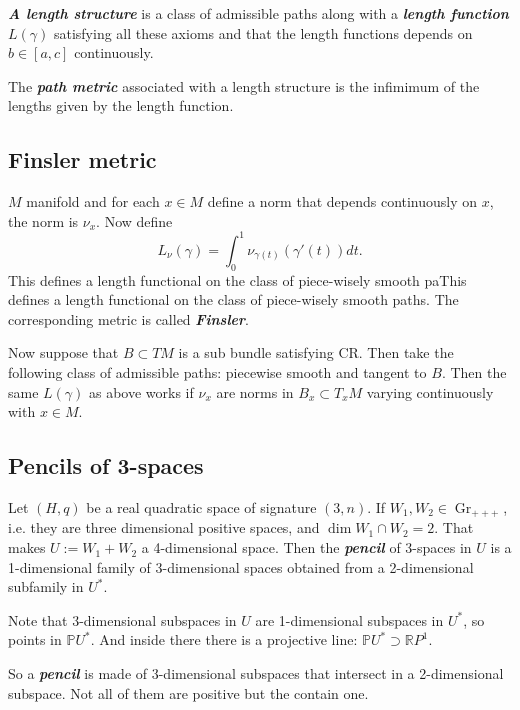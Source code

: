 \begin{defn}\leavevmode
	\textit{\textbf{A length structure}} is a class of admissible paths along with a \textit{\textbf{length function}} $L(\gamma)$ satisfying all these axioms and that the length functions depends on $b\in [a,c]$ continuously.
\end{defn}

\begin{defn}\leavevmode
	The \textit{\textbf{path metric}} associated with a length structure is the infimimum of the lengths given by the length function.
\end{defn}

\subsection{Finsler metric}

\begin{defn}\leavevmode
$M$ manifold and for each  $x \in M$ define a norm that depends continuously on $x$, the norm is $\nu_x$. Now define
\[L_\nu(\gamma)=\int_{0}^1 \nu_{\gamma(t)}(\gamma'(t))dt.\]
This defines a length functional on the class of piece-wisely smooth paThis defines a length functional on the class of piece-wisely smooth paths. The corresponding metric is called \textit{\textbf{Finsler}}.
\end{defn}

\begin{defn}\leavevmode
Now suppose that $B \subset TM$ is a sub bundle satisfying CR. Then take the following class of admissible paths: piecewise smooth and tangent to $B$. Then the same $L(\gamma)$ as above works if $\nu_x$ are norms in  $B_x \subset T_xM$ varying continuously with $x \in M$.
\end{defn}

\subsection{Pencils of 3-spaces}

\begin{defn}\leavevmode
Let $(H,q)$ be a real quadratic space of signature  $(3,n)$. If  $W_1,W_2 \in \operatorname{Gr}_{+ + +}$, i.e. they are three dimensional positive spaces, and  $\dim W_1 \cap W_2=2$. That makes $U:= W_1+W_2$ a 4-dimensional space. Then the \textit{\textbf{pencil}} of 3-spaces in $U$ is a 1-dimensional family of 3-dimensional spaces obtained from a 2-dimensional subfamily in $U^*$.

Note that $3$-dimensional subspaces in $U$ are 1-dimensional subspaces in $U^*$, so points in $\mathbb{P} U^*$. And inside there there is a projective line: $\mathbb{P} U^* \supset \mathbb{R}P^1$.

So a \textit{\textbf{pencil}} is made of 3-dimensional subspaces that intersect in a 2-dimensional subspace. Not all of them are positive but the contain one.
\end{defn}

